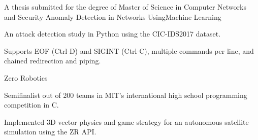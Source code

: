 
\begin{cventries}
  \cventry
    {A thesis submitted for the degree of Master of Science in Computer Networks and Security} %
    {Anomaly Detection in Networks UsingMachine Learning} %
    {} %
    {} %
    {
      \begin{cvitems} %
        \item {An attack detection study in Python using the CIC-IDS2017 dataset.~\href{https://github.com/kahramankostas/Anomaly-Detection-in-Networks-Using-Machine-Learning}{\faGithub}~\href{https://github.com/kahramankostas/Anomaly-Detection-in-Networks-Using-Machine-Learning/blob/master/Anomaly_Detection_in_Networks_Using_Machine_Learning.pdf}{\faExternalLink} }
		\item {Supports EOF (Ctrl-D) and SIGINT (Ctrl-C), multiple commands per line, and chained redirection and piping.}
      \end{cvitems}
    }

  \cventry
    {} %
    {Zero Robotics} %
    {} %
    {} %
    {
      \begin{cvitems} %
      	\item {Semifinalist out of 200 teams in MIT's international high school programming competition in C.}
		\item {Implemented 3D vector physics and game strategy for an autonomous satellite simulation using the ZR API.}
      \end{cvitems}
    }
\end{cventries}